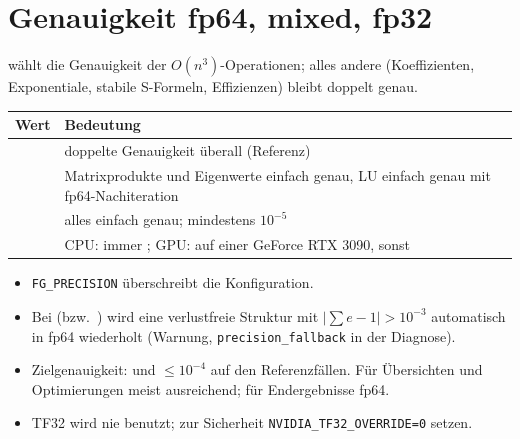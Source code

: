 \section{Genauigkeit fp64, mixed, fp32}\label{sec:genauigkeit}
%
 wählt die Genauigkeit der $O(n^3)$-Operationen; alles andere (Koeffizienten, Exponentiale, stabile
S-Formeln, Effizienzen) bleibt doppelt genau.
\begin{center}
\small
\begin{tabularx}{\linewidth}{lY}
\toprule
Wert & Bedeutung \\
\midrule
{} & doppelte Genauigkeit überall (Referenz) \\
 & Matrixprodukte und Eigenwerte einfach genau, LU einfach genau mit fp64-Nachiteration \\
 & alles einfach genau;  mindestens $10^{-5}$ \\
 & CPU: immer ; GPU:  auf einer GeForce RTX 3090, sonst  \\
\bottomrule
\end{tabularx}
\end{center}
\begin{itemize}
  \item \texttt{FG\_PRECISION} überschreibt die Konfiguration.
  \item Bei  (bzw.\ ) wird eine verlustfreie Struktur mit
        $|\sum e-1|>10^{-3}$ automatisch in fp64 wiederholt (Warnung, \texttt{precision\_fallback} in der Diagnose).
  \item Zielgenauigkeit:  und  $\le10^{-4}$ auf den Referenzfällen. Für Übersichten und
        Optimierungen meist ausreichend; für Endergebnisse fp64.
  \item TF32 wird nie benutzt; zur Sicherheit \texttt{NVIDIA\_TF32\_OVERRIDE=0} setzen.
\end{itemize}

